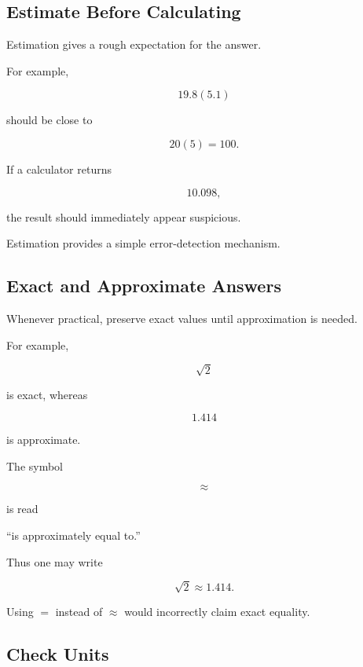 \subsection{Estimate Before Calculating}
\label{subsec:estimate-before-calculating}

Estimation gives a rough expectation for the answer.

For example,

\[ 19.8(5.1) \]

should be close to

\[ 20(5)=100. \]

If a calculator returns

\[ 10.098, \]

the result should immediately appear suspicious.

Estimation provides a simple error-detection mechanism.

\subsection{Exact and Approximate Answers}
\label{subsec:exact-approximate-writing}

Whenever practical, preserve exact values until approximation is needed.

For example,

\[ \sqrt2 \]

is exact, whereas

\[ 1.414 \]

is approximate.

The symbol

\[ \approx \]

is read

\begin{center}
``is approximately equal to.''
\end{center}

Thus one may write

\[ \sqrt2\approx1.414. \]

Using \(=\) instead of \(\approx\) would incorrectly claim exact equality.

\subsection{Check Units}
\label{subsec:check-units}


